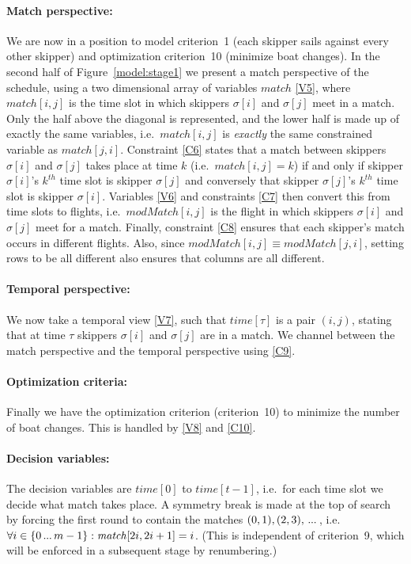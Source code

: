 \documentclass{llncs}
\newcommand{\match}{\mathit{match}}
\newcommand{\modMatch}{\mathit{modMatch}}
\newcommand{\timeVar}{\mathit{time}}
\newcommand\nldots{\,\hbox to 0.8em{.\hss.\hss.}\,}
\begin{document}
\paragraph{Match perspective:} We are now in a position to model criterion~1 (each skipper sails
against every other skipper) and optimization criterion~10 (minimize boat changes).  In the second
half of Figure~\ref{model:stage1} we present a match perspective of the schedule, using a two
dimensional array of variables $\match$ \eqref{V5}, where $\match[{i,j}]$ is the time slot in which
skippers $\sigma[{i}]$ and $\sigma[{j}]$ meet in a match. Only the half above the diagonal is
represented, and the lower half is made up of exactly the same variables, i.e.\ $\match[{i,j}]$ is
\emph{exactly} the same constrained variable as $\match[{j,i}]$. Constraint \eqref{C6} states that
a match between skippers $\sigma[{i}]$ and $\sigma[{j}]$ takes place at time $k$ (i.e.\
$\match[{i,j}] = k$) if and only if  skipper $\sigma[{i}]$'s $k^{th}$ time slot is skipper
$\sigma[{j}]$ and conversely that skipper $\sigma[{j}]$'s $k^{th}$ time slot is skipper
$\sigma[{i}]$. Variables \eqref{V6} and constraints \eqref{C7} then convert this from time slots to
flights, i.e.\ $\modMatch[{i,j}]$ is the flight in which skippers $\sigma[{i}]$ and $\sigma[{j}]$
meet for a match. Finally, constraint \eqref{C8} ensures that each skipper's match occurs in
different flights. Also, since $\modMatch[{i,j}] \equiv \modMatch[{j,i}]$, setting rows to be all
different also ensures that columns are all different.

\paragraph{Temporal perspective:} We now take a temporal view \eqref{V7}, such that
$\timeVar[{\tau}]$ is a pair $(i,j)$, stating that at time $\tau$ skippers $\sigma[{i}]$ and
$\sigma[{j}]$ are in a match. We channel between the match perspective and the temporal perspective
using \eqref{C9}.

\paragraph{Optimization criteria:} Finally we have the optimization criterion (criterion~10) to
minimize the number of boat changes. This is handled by \eqref{V8} and \eqref{C10}.

\paragraph{Decision variables:} The decision variables are $\timeVar[{0}]$ to $\timeVar[{t-1}]$,
i.e.\ for each time slot we decide what match takes place. A symmetry break is made at the top of
search by forcing the first round to contain the matches $(0,1), (2,3), \nldots$, i.e.\ $\forall i
\in \{0 \nldots {m-1}\} : \match[{2i, 2i+1}] = i$. (This is independent of criterion~9, which will
be enforced in a subsequent stage by renumbering.)
\end{document}
